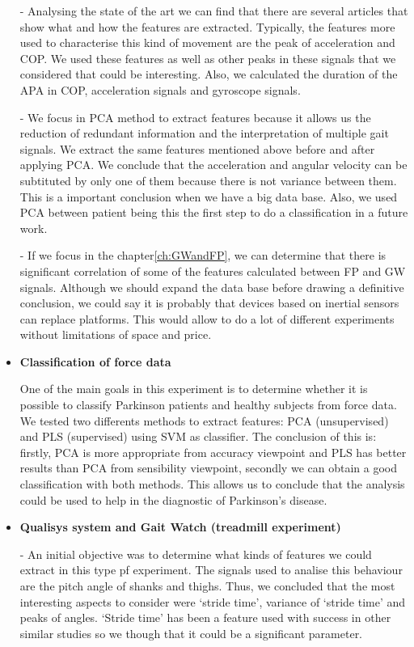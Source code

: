 \begin{itemize}
-	Analysing the state of the art we can find that there are several articles that show what and how the features are extracted. Typically, the features more used to characterise this kind of movement are the peak of acceleration and COP. We used these features  as well as other peaks in these signals that we considered that could be interesting. Also, we calculated the duration of the APA in COP, acceleration signals and gyroscope signals.

-	We focus in PCA method to extract features because it allows us the reduction of redundant information and the interpretation of multiple gait signals. We extract the same features mentioned above before and after applying PCA. We conclude that the acceleration and angular velocity can be subtituted by only one of them because there is not variance between them. This is a important conclusion when we have  a big data base. 
Also, we used PCA between patient  being this the first step to do a classification in a future work.

-	If we focus in the chapter\ref{ch:GWandFP}, we can determine that there is significant correlation  of some of the features calculated between FP and GW signals. Although  we should expand the data base before drawing a definitive conclusion, we could say  it is probably that devices based on inertial sensors can replace platforms. This would allow to do a lot of different experiments without limitations of space and price.

\item \textbf{Classification of force data}

One of the main goals in this experiment is to determine whether it is possible to classify Parkinson patients and healthy subjects from force data. We tested two differents methods to extract features: PCA (unsupervised) and PLS (supervised) using SVM as classifier. The conclusion of this is: firstly, PCA is more appropriate from accuracy viewpoint and PLS has better results than PCA from sensibility viewpoint, secondly we can obtain a good classification with both methods. This allows us to conclude that the analysis could be used to help in the diagnostic of Parkinson's disease.

\item \textbf{Qualisys system and Gait Watch (treadmill experiment)}

-	An initial objective was to determine what kinds of features we could extract in this type pf experiment. The signals used to analise this behaviour are the pitch angle of shanks and thighs. Thus, we concluded that the most interesting aspects to consider were ‘stride time’, variance of ‘stride time’  and peaks of angles. ‘Stride time’ has been a feature used with success in other similar studies so we though that it could be a significant parameter.


\end{itemize}
